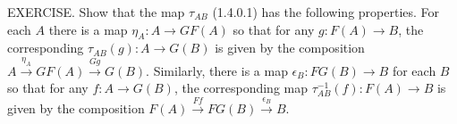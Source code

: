 EXERCISE. Show that the map $\tau_{AB}$ (1.4.0.1) has the following properties. For each $A$ there is a map $\eta_A : A \to GF(A)$ so that for any $g : F(A) \to B$, the corresponding $\tau_{AB}(g) : A \to G(B)$ is given by the composition $A \xrightarrow{\eta_A} GF(A) \xrightarrow{Gg} G(B)$. Similarly, there is a map $\epsilon_B : FG(B) \to B$ for each $B$ so that for any $f : A \to G(B)$, the corresponding map $\tau^{-1}_{AB}(f) : F(A) \to B$ is given by the composition $F(A) \xrightarrow{Ff} FG(B) \xrightarrow{\epsilon_B} B$.

